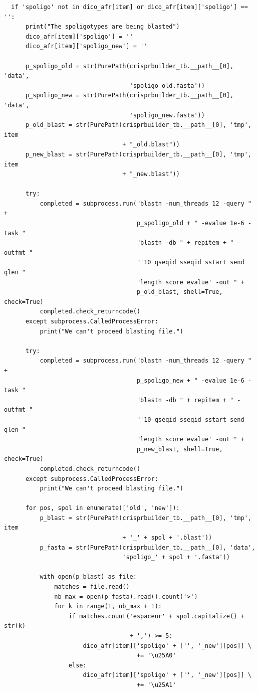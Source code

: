 \documentclass[twoside,a4paper,11pt,frenchb,openany]{report}
\begin{document}
\begin{verbatim}
  if 'spoligo' not in dico_afr[item] or dico_afr[item]['spoligo'] == '':
      print("The spoligotypes are being blasted")
      dico_afr[item]['spoligo'] = ''
      dico_afr[item]['spoligo_new'] = ''

      p_spoligo_old = str(PurePath(crisprbuilder_tb.__path__[0], 'data',
                                   'spoligo_old.fasta'))
      p_spoligo_new = str(PurePath(crisprbuilder_tb.__path__[0], 'data',
                                   'spoligo_new.fasta'))
      p_old_blast = str(PurePath(crisprbuilder_tb.__path__[0], 'tmp', item
                                 + "_old.blast"))
      p_new_blast = str(PurePath(crisprbuilder_tb.__path__[0], 'tmp', item
                                 + "_new.blast"))

      try:
          completed = subprocess.run("blastn -num_threads 12 -query " +
                                     p_spoligo_old + " -evalue 1e-6 -task "
                                     "blastn -db " + repitem + " -outfmt "
                                     "'10 qseqid sseqid sstart send qlen "
                                     "length score evalue' -out " +
                                     p_old_blast, shell=True, check=True)
          completed.check_returncode()
      except subprocess.CalledProcessError:
          print("We can't proceed blasting file.")

      try:
          completed = subprocess.run("blastn -num_threads 12 -query " +
                                     p_spoligo_new + " -evalue 1e-6 -task "
                                     "blastn -db " + repitem + " -outfmt "
                                     "'10 qseqid sseqid sstart send qlen "
                                     "length score evalue' -out " +
                                     p_new_blast, shell=True, check=True)
          completed.check_returncode()
      except subprocess.CalledProcessError:
          print("We can't proceed blasting file.")

      for pos, spol in enumerate(['old', 'new']):
          p_blast = str(PurePath(crisprbuilder_tb.__path__[0], 'tmp', item
                                 + '_' + spol + '.blast'))
          p_fasta = str(PurePath(crisprbuilder_tb.__path__[0], 'data',
                                 'spoligo_' + spol + '.fasta'))

          with open(p_blast) as file:
              matches = file.read()
              nb_max = open(p_fasta).read().count('>')
              for k in range(1, nb_max + 1):
                  if matches.count('espaceur' + spol.capitalize() + str(k)
                                   + ',') >= 5:
                      dico_afr[item]['spoligo' + ['', '_new'][pos]] \
                                     += '\u25A0'
                  else:
                      dico_afr[item]['spoligo' + ['', '_new'][pos]] \
                                     += '\u25A1'


\end{verbatim}
\end{document}
